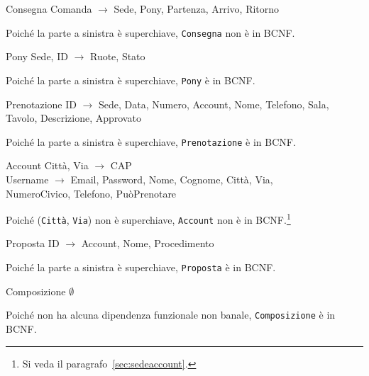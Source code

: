 \begin{samepage}
\begin{funcdep}{Consegna}
    Comanda $\to$ Sede, Pony, Partenza, Arrivo, Ritorno
\end{funcdep}
Poiché la parte a sinistra è superchiave, {\tt Consegna} non è in BCNF.
\end{samepage}

\begin{samepage}
\begin{funcdep}{Pony}
    Sede, ID $\to$ Ruote, Stato
\end{funcdep}
Poiché la parte a sinistra è superchiave, {\tt Pony} è in BCNF.
\end{samepage}

\begin{samepage}
\begin{funcdep}{Prenotazione}
    ID $\to$ Sede, Data, Numero, Account, Nome, Telefono, Sala,\\
        \indent\indent\indent\indent\indent Tavolo, Descrizione, Approvato
\end{funcdep}
Poiché la parte a sinistra è superchiave, {\tt Prenotazione} è in BCNF.
\end{samepage}

\begin{samepage}
\begin{funcdep}{Account}
    Città, Via $\to$ CAP\\
    Username $\to$ Email, Password, Nome, Cognome, Città, Via,\\
        \indent\indent\indent\indent\indent NumeroCivico, Telefono, PuòPrenotare
\end{funcdep}
Poiché ({\tt Città}, {\tt Via}) non è superchiave, {\tt Account} non
è in BCNF.\footnote{Si veda il paragrafo~\vref{sec:sedeaccount}.}
\end{samepage}

\begin{samepage}
\begin{funcdep}{Proposta}
    ID $\to$ Account, Nome, Procedimento
\end{funcdep}
Poiché la parte a sinistra è superchiave, {\tt Proposta} è in BCNF.
\end{samepage}

\begin{samepage}
\begin{funcdep}{Composizione}
    $\emptyset$
\end{funcdep}
Poiché non ha alcuna dipendenza funzionale non banale, {\tt Composizione} è in BCNF.
\end{samepage}

